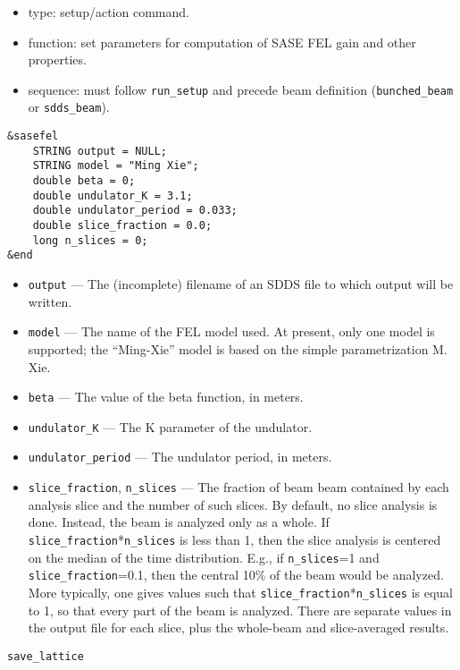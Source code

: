 \documentclass[11pt]{article}
\begin{document}
\begin{itemize}
\item type: setup/action command.
\item function: set parameters for computation of SASE FEL gain and other properties.
\item sequence: must follow \verb|run_setup| and precede beam definition (\verb|bunched_beam| or \verb|sdds_beam|).
\end{itemize}

\begin{verbatim}
&sasefel
    STRING output = NULL;
    STRING model = "Ming Xie";
    double beta = 0;
    double undulator_K = 3.1;
    double undulator_period = 0.033;
    double slice_fraction = 0.0;
    long n_slices = 0;
&end
\end{verbatim}

\begin{itemize}
\item \verb|output| --- The (incomplete) filename of an SDDS file to which output will be
written.
\item \verb|model| --- The name of the FEL model used.  At present, only one model is
supported; the ``Ming-Xie'' model is based on the simple parametrization M. Xie\cite{MingXie}.
\item \verb|beta| --- The value of the beta function, in meters.
\item \verb|undulator_K| --- The K parameter of the undulator.
\item \verb|undulator_period| --- The undulator period, in meters.
\item \verb|slice_fraction|, \verb|n_slices| --- The fraction of beam beam contained by each analysis slice
        and the number of such slices.
        By default, no slice analysis is done.  Instead, the beam is analyzed only as a whole.
        If \verb|slice_fraction|*\verb|n_slices| is less than 1, then the slice analysis
        is centered on the median of the time distribution.  E.g., if \verb|n_slices|=1 and
        \verb|slice_fraction|=0.1, then the central 10\% of the beam would be analyzed.
        More typically, one gives values such that \verb|slice_fraction|*\verb|n_slices| is
        equal to 1, so that every part of the beam is analyzed.  There are separate values in
        the output file for each slice, plus the whole-beam and slice-averaged results.
\end{itemize}

\newpage
\begin{center}{\Large\verb|save_lattice|}\end{center}
\end{document}
